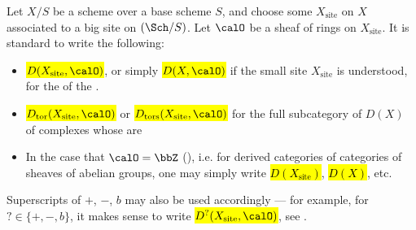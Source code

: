 \begin{notation} \label{notation:derived_category_of_sheaves_of_abelian_groups_on_small_site_of_a_scehem}
    Let $X/S$ be a scheme over a base scheme $S$, and choose some  $X_{\text{site}}$ on $X$ associated to a big site on $(\Sch/S)$. Let $\calO$ be a sheaf of rings on $X_{\text{site}}$. It is standard to write the following:
    \begin{itemize}
        \item \hl{$D(X_{\text{site}}, \calO)$}, or simply \hl{$D(X, \calO)$} if the small site $X_{\text{site}}$ is understood, for the  of the .
        \item \hl{$D_{\mathrm{tor}}(X_{\text{site}}, \calO)$} or \hl{$D_{\mathrm{tors}}(X_{\text{site}}, \calO)$} for the full subcategory of $D(X)$ of complexes whose  are  
        \item In the case that $\calO = \bbZ$ (), i.e. for derived categories of categories of sheaves of abelian groups, one may simply write \hl{$D(X_{\text{site}})$}, \hl{$D(X)$}, etc.
    \end{itemize}
    Superscripts of $+$, $-$, $b$ may also be used accordingly --- for example, for $? \in \{+,-,b\}$, it makes sense to write \hl{$D^?(X_{\text{site}}, \calO)$}, see . 
\end{notation}